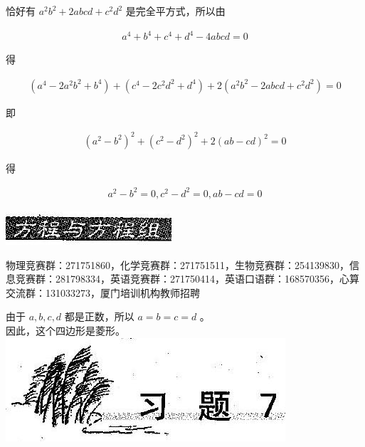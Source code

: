\documentclass[10pt]{article}
\begin{document}
恰好有 $a^{2} b^{2}+2 a b c d+c^{2} d^{2}$ 是完全平方式，所以由

\begin{align*}
a^{4}+b^{4}+c^{4}+d^{4}-4 a b c d=0
\end{align*}

得

\begin{align*}
\left(a^{4}-2 a^{2} b^{2}+b^{4}\right)+\left(c^{4}-2 c^{2} d^{2}+d^{4}\right)+2\left(a^{2} b^{2}-2 a b c d+c^{2} d^{2}\right)=0
\end{align*}

即

\begin{align*}
\left(a^{2}-b^{2}\right)^{2}+\left(c^{2}-d^{2}\right)^{2}+2(a b-c d)^{2}=0
\end{align*}

得

\begin{align*}
a^{2}-b^{2}=0, c^{2}-d^{2}=0, a b-c d=0
\end{align*}

\begin{center}
\includegraphics[max width=\textwidth]{2024_10_30_26b590fd1106d28139f0g-044}
\end{center}

物理竞赛群：271751860，化学竞赛群：271751511，生物竞赛群：254139830，信息竞赛群：281798334，英语竞赛群：271750414，英语口语群：168570356，心算交流群：131033273，厦门培训机构教师招聘

由于 $a, b, c, d$ 都是正数，所以 $a=b=c=d$ 。\\
因此，这个四边形是菱形。\\
\includegraphics[max width=\textwidth, center]{2024_10_30_26b590fd1106d28139f0g-045}
\end{document}
